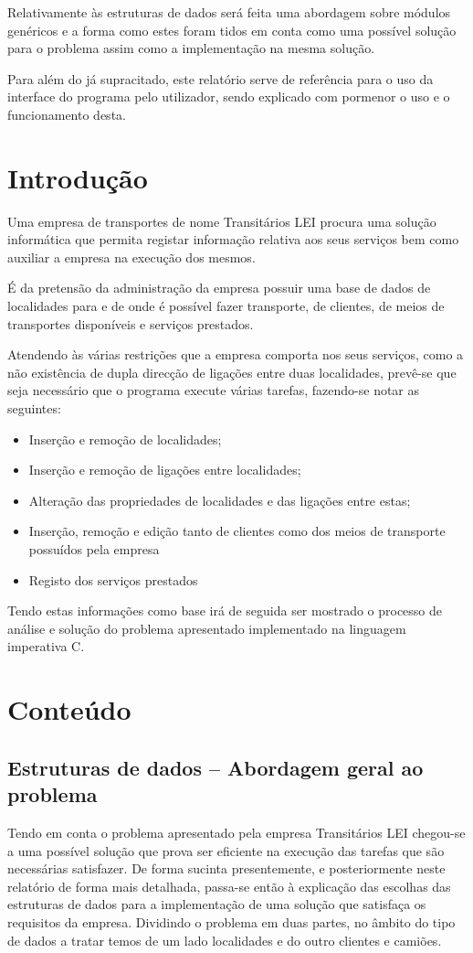 \documentclass[a5paper,twocolumn, 11pt]{article}
\begin{document}
Relativamente às estruturas de dados será feita uma abordagem sobre módulos genéricos e a forma como estes foram tidos em conta como uma possível solução para o problema assim como a implementação na mesma solução.

Para além do já supracitado, este relatório serve de referência para o uso da interface do programa pelo utilizador, sendo explicado com pormenor o uso e o funcionamento desta.

\clearpage
\section{Introdução}
Uma empresa de transportes de nome Transitários LEI procura uma solução informática que permita registar informação relativa aos seus serviços bem como auxiliar a empresa na execução dos mesmos.

É da pretensão da administração da empresa possuir uma base de dados de localidades para e de onde é possível fazer transporte, de clientes, de meios de transportes disponíveis e serviços prestados.

Atendendo às várias restrições que a empresa comporta nos seus serviços, como a não existência de dupla direcção de ligações entre duas localidades, prevê-se que seja necessário que o programa execute várias tarefas, fazendo-se notar as seguintes:
\begin{itemize}
    \item{Inserção e remoção de localidades;}
    \item{Inserção e remoção de ligações entre localidades;}
    \item{Alteração das propriedades de localidades e das ligações entre estas;}
    \item{Inserção, remoção e edição tanto de clientes como dos meios de transporte possuídos pela empresa}
    \item{Registo dos serviços prestados}
\end{itemize}
Tendo estas informações como base irá de seguida ser mostrado o processo de análise e
solução do problema apresentado implementado na linguagem imperativa C.

\clearpage
\section{Conteúdo}
\subsection[Estruturas de dados]{Estruturas de dados -- Abordagem geral ao problema}
\label{abordagem geral}
Tendo em conta o problema apresentado pela empresa Transitários LEI chegou-se a uma possível solução que prova ser eficiente na execução das tarefas que são necessárias satisfazer. De forma sucinta presentemente, e posteriormente neste relatório de forma mais detalhada, passa-se então à explicação das escolhas das estruturas de dados para a implementação de uma solução que satisfaça os requisitos da empresa. Dividindo o problema em duas partes, no âmbito do tipo de dados a tratar temos de um lado localidades e do outro clientes e camiões.
\end{document}
